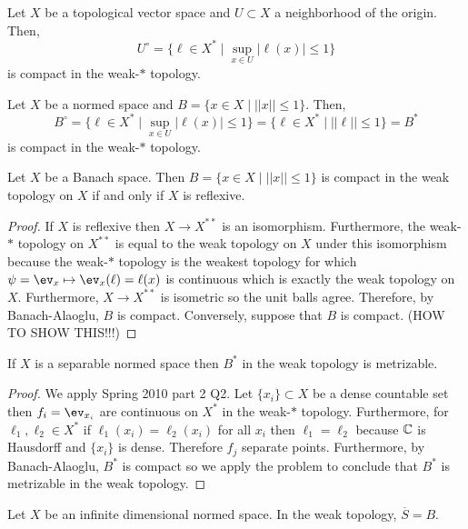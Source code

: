 \documentclass[12pt]{article}
\begin{document}
\begin{thm}
Let $X$ be a topological vector space and $U \subset X$ a neighborhood of the origin. Then,
\[ U^\circ = \{ \ell \in X^* \mid \sup_{x \in U} | \ell(x) | \le 1 \} \]
is compact in the weak-$*$ topology.
\end{thm}

\begin{cor}
Let $X$ be a normed space and $B = \{ x \in X \mid || x || \le 1 \}$. Then,
\[ B^\circ = \{ \ell \in X^* \mid \sup_{x \in U} | \ell(x) | \le 1 \} = \{ \ell \in X^* \mid || \ell || \le 1 \} = B^* \]
is compact in the weak-$*$ topology. 
\end{cor}

\begin{prop}
Let $X$ be a Banach space. Then $B = \{ x \in X \mid || x || \le 1 \}$ is compact in the weak topology on $X$ if and only if $X$ is reflexive.
\end{prop}

\begin{proof}
If $X$ is reflexive then $X \to X^{**}$ is an isomorphism. Furthermore, the weak-$*$ topology on $X^{**}$ is equal to the weak topology on $X$ under this isomorphism because the weak-$*$ topology is the weakest topology for which $\psi = \ev_x \mapsto \ev_x(\ell) = \ell(x)$ is continuous which is exactly the weak topology on $X$. Furthermore, $X \to X^{**}$ is isometric so the unit balls agree. Therefore, by Banach-Alaoglu, $B$ is compact. Conversely, suppose that $B$ is compact. (HOW TO SHOW THIS!!!)
\end{proof}

\begin{prop}
If $X$ is a separable normed space then $B^*$ in the weak topology is metrizable.
\end{prop}

\begin{proof}
We apply Spring 2010 part 2 Q2. Let $\{ x_i \} \subset X$ be a dense countable set then $f_i = \ev_{x_i}$ are continuous on $X^*$ in the weak-$*$ topology. Furthermore, for $\ell_1, \ell_2 \in X^*$ if $\ell_1(x_i) = \ell_2(x_i)$ for all $x_i$ then $\ell_1 = \ell_2$ because $\mathbb{C}$ is Hausdorff and $\{ x_i \}$ is dense. Therefore $f_j$ separate points. Furthermore, by Banach-Alaoglu, $B^*$ is compact so we apply the problem to conclude that $B^*$ is metrizable in the weak topology.
\end{proof}

\begin{lemma}
Let $X$ be an infinite dimensional normed space. In the weak topology, $\overline{S} = B$.
\end{lemma}
\end{document}

